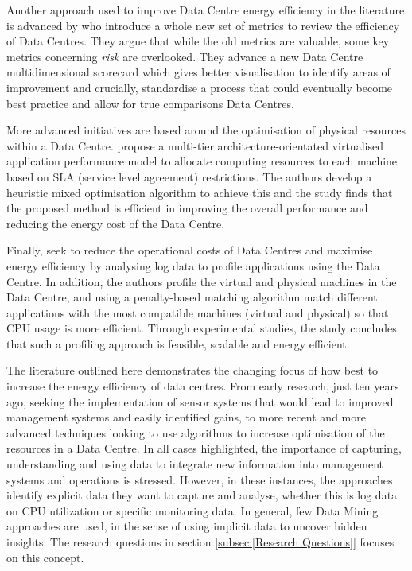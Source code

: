 \documentclass[12pt]{scrartcl}
\begin{document}
Another approach used to improve Data Centre energy efficiency in the literature is advanced by \citet{edsdoj.99f37e7899fb4fcaabdaa81e395626c420180101} who introduce a whole new set of metrics to review the efficiency of Data Centres. They argue that while the old metrics are valuable, some key metrics concerning \emph{risk} are overlooked. They advance a new Data Centre multidimensional scorecard which gives better visualisation to identify areas of improvement and crucially, standardise a process that could eventually become best practice and allow for true comparisons Data Centres. 

More advanced initiatives are based around the optimisation of physical resources within a Data Centre. \citet{10234066620151001} propose a multi-tier architecture-orientated virtualised application performance model to allocate computing resources to each machine based on SLA (service level agreement) restrictions. The authors develop a heuristic mixed optimisation algorithm to achieve this and the study finds that the proposed method is efficient in improving the overall performance and reducing the energy cost of the Data Centre.

Finally, \citet{VASUDEVAN201794} seek to reduce the operational costs of Data Centres and maximise energy efficiency by analysing log data to profile applications using the Data Centre. In addition, the authors profile the virtual and physical machines in the Data Centre, and using a penalty-based matching algorithm match different applications with the most compatible machines (virtual and physical) so that CPU usage is more efficient. Through experimental studies, the study concludes that such a profiling approach is feasible, scalable and energy efficient.

The literature outlined here demonstrates the changing focus of how best to increase the energy efficiency of data centres. From early research, just ten years ago, seeking the implementation of sensor systems that would lead to improved management systems and easily identified gains, to more recent and more advanced techniques looking to use algorithms to increase optimisation of the resources in a Data Centre. In all cases highlighted, the importance of capturing, understanding and using data to integrate new information into management systems and operations is stressed. However, in these instances, the approaches identify explicit data they want to capture and analyse, whether this is log data on CPU utilization or specific monitoring data. In general, few Data Mining approaches are used, in the sense of using implicit data to uncover hidden insights. The research questions in section \ref{subsec:[Research Questions]} focuses on this concept.  
\end{document}

